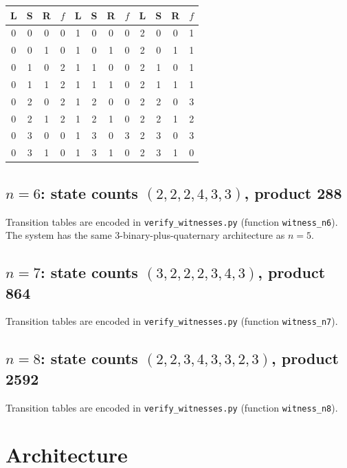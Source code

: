 \documentclass[11pt]{article}
\begin{document}
\begin{center}
\begin{tabular}{cccc@{\qquad}cccc@{\qquad}cccc}
\toprule
L & S & R & $f$ & L & S & R & $f$ & L & S & R & $f$ \\
\midrule
0 & 0 & 0 & 0 & 1 & 0 & 0 & 0 & 2 & 0 & 0 & 1 \\
0 & 0 & 1 & 0 & 1 & 0 & 1 & 0 & 2 & 0 & 1 & 1 \\
0 & 1 & 0 & 2 & 1 & 1 & 0 & 0 & 2 & 1 & 0 & 1 \\
0 & 1 & 1 & 2 & 1 & 1 & 1 & 0 & 2 & 1 & 1 & 1 \\
0 & 2 & 0 & 2 & 1 & 2 & 0 & 0 & 2 & 2 & 0 & 3 \\
0 & 2 & 1 & 2 & 1 & 2 & 1 & 0 & 2 & 2 & 1 & 2 \\
0 & 3 & 0 & 0 & 1 & 3 & 0 & 3 & 2 & 3 & 0 & 3 \\
0 & 3 & 1 & 0 & 1 & 3 & 1 & 0 & 2 & 3 & 1 & 0 \\
\bottomrule
\end{tabular}
\end{center}

\subsection*{$n = 6$: state counts $(2, 2, 2, 4, 3, 3)$, product 288}

Transition tables are encoded in \texttt{verify\_witnesses.py} (function \texttt{witness\_n6}). The system has the same 3-binary-plus-quaternary architecture as $n=5$.

\subsection*{$n = 7$: state counts $(3, 2, 2, 2, 3, 4, 3)$, product 864}

Transition tables are encoded in \texttt{verify\_witnesses.py} (function \texttt{witness\_n7}).

\subsection*{$n = 8$: state counts $(2, 2, 3, 4, 3, 3, 2, 3)$, product 2592}

Transition tables are encoded in \texttt{verify\_witnesses.py} (function \texttt{witness\_n8}).

\section{Architecture}
\end{document}
